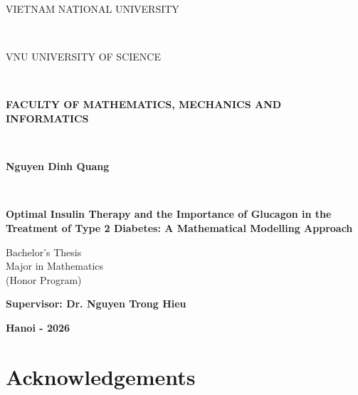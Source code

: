 \documentclass[13pt, a4paper, oneside]{book}
\numberwithin{subsection}{section}
\begin{document}
\clearpage
\thispagestyle{plain}
\thispagestyle{empty}
\thisfancypage{
	\setlength{\fboxsep}{0pt}
	\fbox}{} 
	\vspace{1.5 cm}
\begin{center}
\begin{large}
{\fontsize{13pt}{1}\selectfont VIETNAM NATIONAL UNIVERSITY}
\end{large} \\
\begin{large}
{\fontsize{13pt}{1}\selectfont VNU UNIVERSITY OF SCIENCE}
\end{large} \\
\begin{large}
{\fontsize{13pt}{1}\selectfont \textbf{FACULTY OF MATHEMATICS, MECHANICS AND INFORMATICS}}
\end{large} \\
\vspace{3 cm}
\begin{large}
{\fontsize{14pt}{1}\selectfont \textbf{Nguyen Dinh Quang}}
\end{large} \\
\end{center}

\vspace{3.5 cm}
\begin{center}
\fontsize{16pt}{1}\selectfont\textbf{Optimal Insulin Therapy and the Importance of Glucagon in the Treatment of  Type 2 Diabetes: A Mathematical Modelling Approach}
\vspace{4 cm}
\end{center}
\begin{center}
{\fontsize{14pt}{1}\selectfont Bachelor’s Thesis \\
Major in Mathematics \\
(Honor Program)}
\end{center}
\vspace{2 cm}

\begin{center}
{\fontsize{14pt}{1}\selectfont \textbf{Supervisor: Dr. Nguyen Trong Hieu}}
\end{center}
\vspace{2.5 cm}
\begin{center} 
{\fontsize{14pt}{1}\selectfont \textbf{Hanoi - 2026}}
\end{center}

\clearpage
\thispagestyle{plain}
\setcounter{page}{1}

\chapter*{Acknowledgements}
\end{document}
